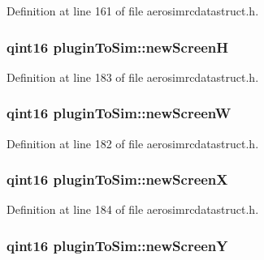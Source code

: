 \-Definition at line 161 of file aerosimrcdatastruct.\-h.

\hypertarget{group___aero_sim_r_c_ga6ac6931958ba1a74ff06dbfe7dba5676}{
\subsubsection[{new\-Screen\-H}]{\setlength{\rightskip}{0pt plus 5cm}qint16 {\bf plugin\-To\-Sim\-::new\-Screen\-H}}}\label{group___aero_sim_r_c_ga6ac6931958ba1a74ff06dbfe7dba5676}


\-Definition at line 183 of file aerosimrcdatastruct.\-h.

\hypertarget{group___aero_sim_r_c_ga73893f1a06af3481486ee34ef91001c0}{
\subsubsection[{new\-Screen\-W}]{\setlength{\rightskip}{0pt plus 5cm}qint16 {\bf plugin\-To\-Sim\-::new\-Screen\-W}}}\label{group___aero_sim_r_c_ga73893f1a06af3481486ee34ef91001c0}


\-Definition at line 182 of file aerosimrcdatastruct.\-h.

\hypertarget{group___aero_sim_r_c_gacb23e684331322adcce5771dc717ea18}{
\subsubsection[{new\-Screen\-X}]{\setlength{\rightskip}{0pt plus 5cm}qint16 {\bf plugin\-To\-Sim\-::new\-Screen\-X}}}\label{group___aero_sim_r_c_gacb23e684331322adcce5771dc717ea18}


\-Definition at line 184 of file aerosimrcdatastruct.\-h.

\hypertarget{group___aero_sim_r_c_gad5aa10f7542e0fcf3d4ac3981efc93a2}{
\subsubsection[{new\-Screen\-Y}]{\setlength{\rightskip}{0pt plus 5cm}qint16 {\bf plugin\-To\-Sim\-::new\-Screen\-Y}}}\label{group___aero_sim_r_c_gad5aa10f7542e0fcf3d4ac3981efc93a2}



